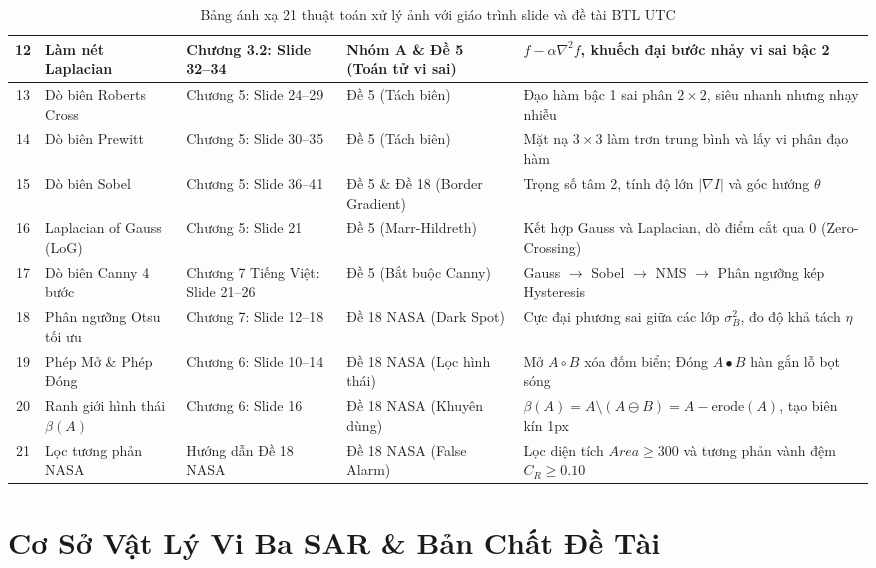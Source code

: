 \documentclass[11pt,a4paper]{article}
\begin{document}
\begin{table}[H]
\begin{tabularx}{\textwidth}{|c|>{\raggedright\arraybackslash}p{2.6cm}|>{\raggedright\arraybackslash}p{3.2cm}|>{\raggedright\arraybackslash}p{2.6cm}|X|}
\hline
12 & Làm nét Laplacian & Chương 3.2: Slide 32--34 & Nhóm A \& Đề 5 (Toán tử vi sai) & $f - \alpha \nabla^2 f$, khuếch đại bước nhảy vi sai bậc 2 \\
\hline
13 & Dò biên Roberts Cross & Chương 5: Slide 24--29 & Đề 5 (Tách biên) & Đạo hàm bậc 1 sai phân $2 \times 2$, siêu nhanh nhưng nhạy nhiễu \\
\hline
14 & Dò biên Prewitt & Chương 5: Slide 30--35 & Đề 5 (Tách biên) & Mặt nạ $3 \times 3$ làm trơn trung bình và lấy vi phân đạo hàm \\
\hline
15 & Dò biên Sobel & Chương 5: Slide 36--41 & Đề 5 \& Đề 18 (Border Gradient) & Trọng số tâm 2, tính độ lớn $|\nabla I|$ và góc hướng $\theta$ \\
\hline
16 & Laplacian of Gauss (LoG) & Chương 5: Slide 21 & Đề 5 (Marr-Hildreth) & Kết hợp Gauss và Laplacian, dò điểm cắt qua 0 (Zero-Crossing) \\
\hline
17 & Dò biên Canny 4 bước & Chương 7 Tiếng Việt: Slide 21--26 & Đề 5 (Bắt buộc Canny) & Gauss $\to$ Sobel $\to$ NMS $\to$ Phân ngưỡng kép Hysteresis \\
\hline
18 & Phân ngưỡng Otsu tối ưu & Chương 7: Slide 12--18 & Đề 18 NASA (Dark Spot) & Cực đại phương sai giữa các lớp $\sigma_B^2$, đo độ khả tách $\eta$ \\
\hline
19 & Phép Mở \& Phép Đóng & Chương 6: Slide 10--14 & Đề 18 NASA (Lọc hình thái) & Mở $A \circ B$ xóa đốm biển; Đóng $A \bullet B$ hàn gắn lỗ bọt sóng \\
\hline
20 & Ranh giới hình thái $\beta(A)$ & Chương 6: Slide 16 & Đề 18 NASA (Khuyên dùng) & $\beta(A) = A \setminus (A \ominus B) = A - \text{erode}(A)$, tạo biên kín 1px \\
\hline
21 & Lọc tương phản NASA & Hướng dẫn Đề 18 NASA & Đề 18 NASA (False Alarm) & Lọc diện tích $Area \ge 300$ và tương phản vành đệm $C_R \ge 0.10$ \\
\hline
\end{tabularx}
\caption{Bảng ánh xạ 21 thuật toán xử lý ảnh với giáo trình slide và đề tài BTL UTC}
\label{tab:mapping_utc}
\end{table}

\newpage

\section{Cơ Sở Vật Lý Vi Ba SAR \& Bản Chất Đề Tài}
\end{document}

